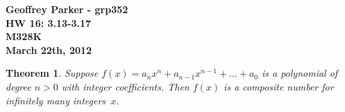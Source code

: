 \documentclass[12pt,leqno]{article}
\numberwithin{equation}{section}
\newtheorem{thm}{Theorem}[section]
\theoremstyle{definition}
\begin{document}
\thispagestyle{plain}
\begin{flushright}
\large{\textbf{Geoffrey Parker - grp352 \\
HW 16: 3.13-3.17\\
M328K \\
March 22th, 2012 \\}}
\end{flushright}

\markboth{}{} \setcounter{section}{0} \baselineskip=18pt

\setcounter{tocdepth}{4}



\setcounter{section}{3}

\setcounter{thm}{12}

\begin{thm}
Suppose $f(x) = a_nx^n + a_{n-1}x^{n-1} + \hdots + a_0$ is a
polynomial of degree $n > 0$ with integer coefficients.  Then $f(x)$
is a composite number for infinitely many integers~$x$.
\end{thm}
\end{document}
